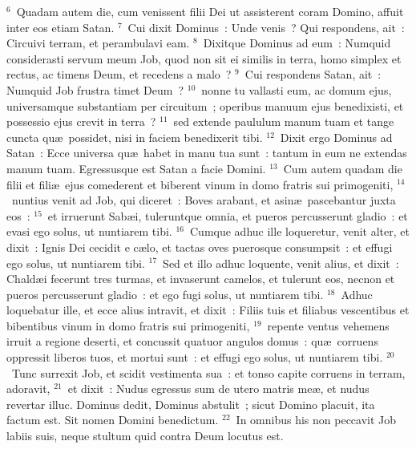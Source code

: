 ${}^{6}$~Quadam autem die, cum venissent filii Dei ut assisterent coram Domino, affuit inter eos etiam Satan.
${}^{7}$~Cui dixit Dominus~: Unde venis~? Qui respondens, ait~: Circuivi terram, et perambulavi eam.
${}^{8}$~Dixitque Dominus ad eum~: Numquid considerasti servum meum Job, quod non sit ei similis in terra, homo simplex et rectus, ac timens Deum, et recedens a malo~?
${}^{9}$~Cui respondens Satan, ait~: Numquid Job frustra timet Deum~?
${}^{10}$~nonne tu vallasti eum, ac domum ejus, universamque substantiam per circuitum~; operibus manuum ejus benedixisti, et possessio ejus crevit in terra~?
${}^{11}$~sed extende paululum manum tuam et tange cuncta qu\ae\ possidet, nisi in faciem benedixerit tibi.
${}^{12}$~Dixit ergo Dominus ad Satan~: Ecce universa qu\ae\ habet in manu tua sunt~: tantum in eum ne extendas manum tuam. Egressusque est Satan a facie Domini.
${}^{13}$~Cum autem quadam die filii et fili\ae\ ejus comederent et biberent vinum in domo fratris sui primogeniti,
${}^{14}$~nuntius venit ad Job, qui diceret~: Boves arabant, et asin\ae\ pascebantur juxta eos~:
${}^{15}$~et irruerunt Sab\ae i, tuleruntque omnia, et pueros percusserunt gladio~: et evasi ego solus, ut nuntiarem tibi.
${}^{16}$~Cumque adhuc ille loqueretur, venit alter, et dixit~: Ignis Dei cecidit e c\ae lo, et tactas oves puerosque consumpsit~: et effugi ego solus, ut nuntiarem tibi.
${}^{17}$~Sed et illo adhuc loquente, venit alius, et dixit~: Chald\ae i fecerunt tres turmas, et invaserunt camelos, et tulerunt eos, necnon et pueros percusserunt gladio~: et ego fugi solus, ut nuntiarem tibi.
${}^{18}$~Adhuc loquebatur ille, et ecce alius intravit, et dixit~: Filiis tuis et filiabus vescentibus et bibentibus vinum in domo fratris sui primogeniti,
${}^{19}$~repente ventus vehemens irruit a regione deserti, et concussit quatuor angulos domus~: qu\ae\ corruens oppressit liberos tuos, et mortui sunt~: et effugi ego solus, ut nuntiarem tibi.
${}^{20}$~Tunc surrexit Job, et scidit vestimenta sua~: et tonso capite corruens in terram, adoravit,
${}^{21}$~et dixit~: Nudus egressus sum de utero matris me\ae , et nudus revertar illuc. Dominus dedit, Dominus abstulit~; sicut Domino placuit, ita factum est. Sit nomen Domini benedictum.
${}^{22}$~In omnibus his non peccavit Job labiis suis, neque stultum quid contra Deum locutus est.

